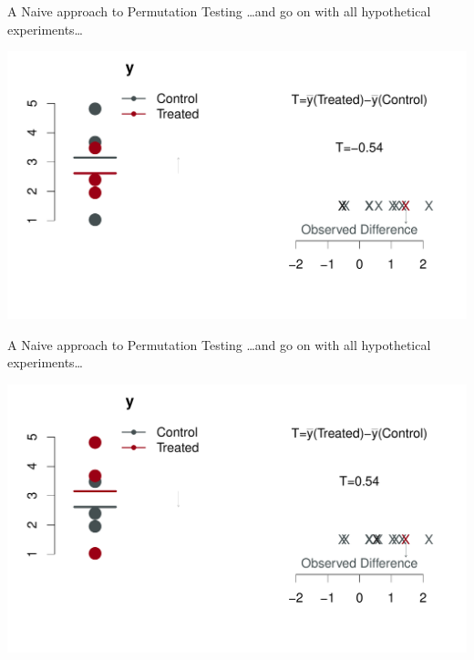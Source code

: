 \begin{frame}{A Naive approach to Permutation Testing}
\ldots and go on with all hypothetical experiments\ldots
\begin{center}
\includegraphics[width=1.1\textwidth]{figures/permsslides10} 
\end{center}
\end{frame}


\begin{frame}{A Naive approach to Permutation Testing}
 \ldots and go on with all hypothetical experiments\ldots 
\begin{center}
\includegraphics[width=1.1\textwidth]{figures/permsslides11} 
\end{center}
\end{frame}


